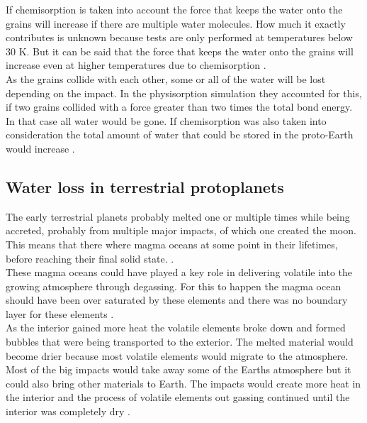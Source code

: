 \newpage
If chemisorption is taken into account the force that keeps the water onto the grains will increase if there are multiple water molecules. How much it exactly contributes is unknown because tests are only performed at temperatures below 30 K. But it can be said that the force that keeps the water onto the grains will increase even at higher temperatures due to chemisorption \cite{TPchemistry}. \\

As the grains collide with each other, some or all of the water will be lost depending on the impact. In the physisorption simulation they accounted for this, if two grains collided with a force greater than two times the total bond energy. In that case all water would be gone. If chemisorption was also taken into consideration the total amount of water that could be stored in the proto-Earth would increase \cite{TPStimpf1} \cite{TPStimpf2}.


\subsection{Water loss in terrestrial protoplanets}
The early terrestrial planets probably melted one or multiple times while being accreted, probably from multiple major impacts, of which one created the moon. This means that there where magma oceans at some point in their lifetimes, before reaching their final solid state.  \cite{TPformationPlanetesimals}. \\

These magma oceans could have played a key role in delivering volatile into the growing atmosphere through degassing. For this to happen the magma ocean should have been over saturated by these elements and there was no boundary layer for these elements \cite[p.~128-129]{TPmagma}. \\

As the interior gained more heat the volatile elements broke down and formed bubbles that were being transported to the exterior. The melted material would become drier because most volatile elements would migrate to the atmosphere. Most of the big impacts would take away some of the Earths atmosphere but it could also bring other materials to Earth. The impacts would create more heat in the interior and the process of volatile elements out gassing continued until the interior was completely dry \cite[p.~130-131]{TPmagma}.\\

